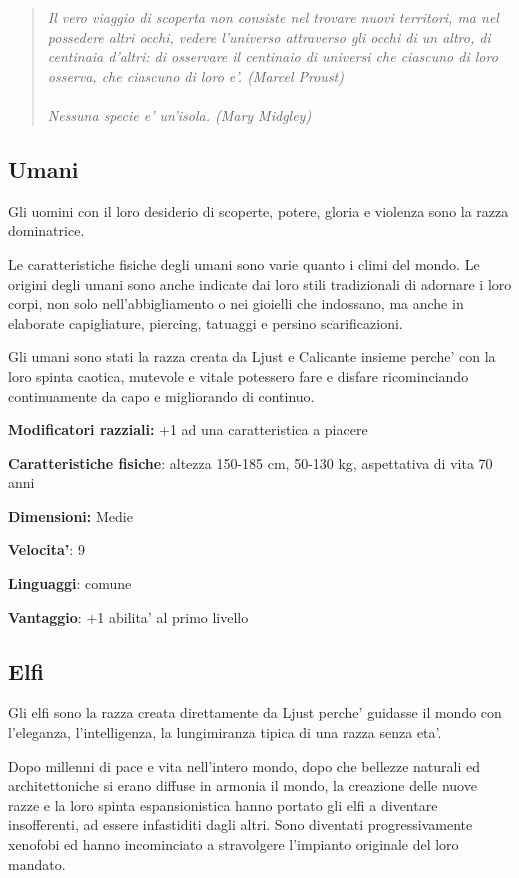 \documentclass[a4paper,11pt,twoside,openany]{book}
\begin{document}
\begin{quote}\textit{
Il vero viaggio di scoperta non consiste nel trovare nuovi territori, ma nel possedere altri occhi, vedere l'universo attraverso gli occhi di un altro, di centinaia d'altri: di osservare il centinaio di universi che ciascuno di loro osserva, che ciascuno di loro e'. (Marcel Proust)\\
\\
Nessuna specie e' un'isola. (Mary Midgley)
}\end{quote}

\subsection{Umani}

Gli uomini con il loro desiderio di scoperte, potere, gloria e violenza sono la razza dominatrice.

Le caratteristiche fisiche degli umani sono varie quanto i climi del mondo. Le origini degli umani sono anche indicate dai loro stili tradizionali di adornare i loro corpi, non solo nell'abbigliamento o nei gioielli che indossano, ma anche in elaborate capigliature, piercing, tatuaggi e persino scarificazioni.

Gli umani sono stati la razza creata da Ljust e Calicante insieme perche' con la loro spinta caotica, mutevole e vitale potessero fare e disfare ricominciando continuamente da capo e migliorando di continuo.

\textbf{Modificatori razziali:} +1 ad una caratteristica a piacere

\textbf{Caratteristiche fisiche}: altezza 150-185 cm, 50-130 kg, aspettativa di vita 70 anni

\textbf{Dimensioni:} Medie

\textbf{Velocita'}: 9

\textbf{Linguaggi}: comune

\textbf{Vantaggio}: +1 abilita' al primo livello

\subsection{Elfi}

\label{elfi}

Gli elfi sono la razza creata direttamente da Ljust perche' guidasse il mondo con l'eleganza, l'intelligenza, la lungimiranza tipica di una razza senza eta'.

Dopo millenni di pace e vita nell'intero mondo, dopo che bellezze naturali ed architettoniche si erano diffuse in armonia il mondo, la creazione delle nuove razze e la loro spinta espansionistica hanno portato gli elfi a diventare insofferenti, ad essere infastiditi dagli altri. Sono diventati progressivamente xenofobi ed hanno incominciato a stravolgere l'impianto originale del loro mandato.
\end{document}
